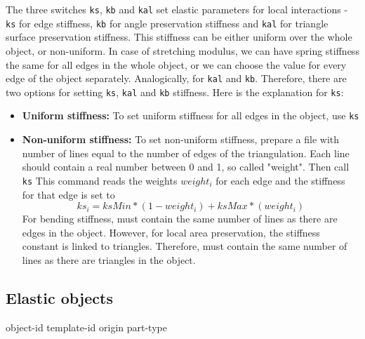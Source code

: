 The three switches \verb|ks|, \verb|kb| and \verb|kal| set elastic parameters for local interactions - \verb|ks| for edge stiffness, \verb|kb| for angle preservation stiffness and \verb|kal| for triangle surface preservation stiffness. This stiffness can be either uniform over the whole object, or non-uniform. In case of stretching modulus, we can have spring stiffness the same for all edges in the whole object, or we can choose the value for every edge of the object separately. Analogically, for \verb|kal| and \verb|kb|. Therefore, there are two options for setting \verb|ks|, \verb|kal| and \verb|kb| stiffness. Here is the explanation for \verb|ks|:
\begin{itemize}
\item {\bf Uniform stiffness:} To set uniform stiffness for all edges in the object, use \verb|ks| 
\item {\bf Non-uniform stiffness:} To set non-uniform stiffness, prepare a file  with number of lines equal to the number of edges of the triangulation. Each line should contain a real number between 0 and 1, so called "weight". Then call
\verb|ks|   
This command reads the weights $weight_i$ for each edge and the stiffness for that edge is set to 
$$
ks_i = ksMin * (1 - weight_i) + ksMax*(weight_i)
$$
For bending stiffness,  must contain the same number of lines as there are edges in the object. However, for local area preservation, the stiffness constant is linked to triangles. Therefore,  must contain the same number of lines as there are triangles in the object.
\end{itemize}


\subsection{\label{ssec:oif-add-object}Elastic objects}

\begin{essyntax}
  object-id  
  template-id  
  origin   
  part-type 
  \begin{features}
  \end{features}
\end{essyntax}

